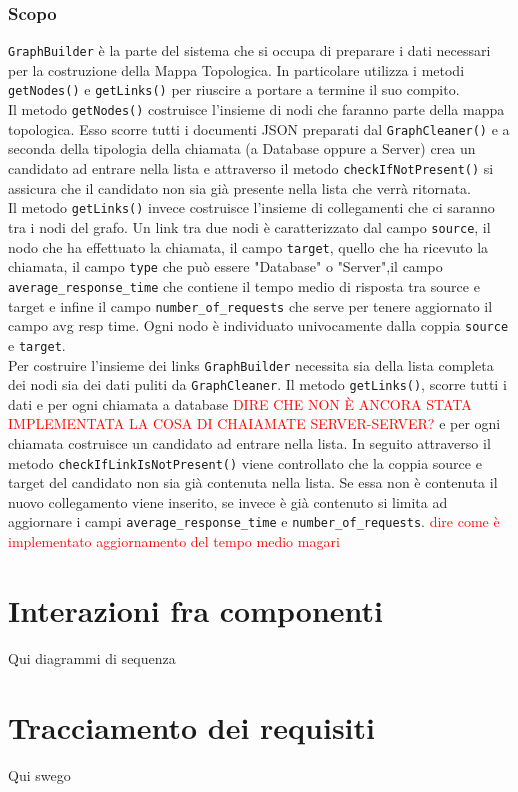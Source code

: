 	\subsubsection{Scopo}
	\texttt{GraphBuilder} è la parte del sistema che si occupa di preparare i dati necessari per la costruzione della Mappa Topologica. In particolare utilizza i metodi \texttt{getNodes()} e \texttt{getLinks()} per riuscire a portare a termine il suo compito.\\
	Il metodo \texttt{getNodes()} costruisce l'insieme di nodi che faranno parte della mappa topologica. Esso scorre tutti i documenti JSON preparati dal \texttt{GraphCleaner()} e a seconda della tipologia della chiamata (a Database oppure a Server) crea un candidato ad entrare nella lista e attraverso il metodo \texttt{checkIfNotPresent()} si assicura che il candidato non sia già presente nella lista che verrà ritornata.\\
	Il metodo \texttt{getLinks()} invece costruisce l'insieme di collegamenti che ci saranno tra i nodi del grafo. Un link tra due nodi è caratterizzato dal campo \texttt{source}, il nodo che ha effettuato la chiamata, il campo \texttt{target}, quello che ha ricevuto la chiamata, il campo \texttt{type} che può essere "Database" o "Server",il campo \texttt{average\_response\_time} che contiene il tempo medio di risposta tra source e target e infine il campo \texttt{number\_of\_requests} che serve per tenere aggiornato il campo avg resp time. Ogni nodo è individuato univocamente dalla coppia \texttt{source} e \texttt{target}.\\	
	Per costruire l'insieme dei links \texttt{GraphBuilder} necessita sia della lista completa dei nodi sia dei dati puliti da \texttt{GraphCleaner}. Il metodo \texttt{getLinks()}, scorre tutti i dati e per ogni chiamata a database \textcolor{red}{DIRE CHE NON È ANCORA STATA IMPLEMENTATA LA COSA DI CHAIAMATE SERVER-SERVER?} e per ogni chiamata costruisce un candidato ad entrare nella lista. In seguito attraverso il metodo \texttt{checkIfLinkIsNotPresent()} viene controllato che la coppia source e target del candidato non sia già contenuta nella lista. Se essa non è contenuta il nuovo collegamento viene inserito, se invece è già contenuto si limita ad aggiornare i campi \texttt{average\_response\_time} e \texttt{number\_of\_requests}. \textcolor{red}{dire come è implementato aggiornamento del tempo medio magari}


\section{Interazioni fra componenti}
\label{sec:Interazioni}
Qui diagrammi di sequenza

\section{Tracciamento dei requisiti}
\label{sec:Tracciamento}
Qui swego 
